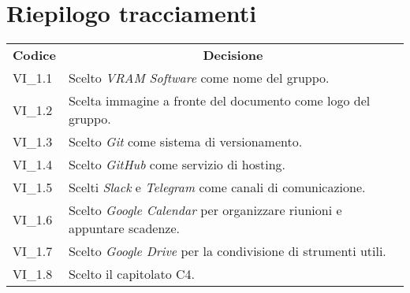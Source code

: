 % 
\setcounter{secnumdepth}{0}
\section{Riepilogo tracciamenti}
\begin{longtable} {
		>{\centering}p{17mm} 
		>{}p{120mm}}
	\rowcolor{gray!50}
	\textbf{Codice} & \multicolumn{1}{c}{\textbf{Decisione}} \\%
	VI\_1.1 & Scelto \textit{VRAM Software} come nome del gruppo. \TBstrut \\ [2mm]
	VI\_1.2 & Scelta immagine a fronte del documento come logo del gruppo. \TBstrut \\ [2mm]
	VI\_1.3 & Scelto \textit{Git} come sistema di versionamento. \TBstrut \\ [2mm]
	VI\_1.4 & Scelto \textit{GitHub} come servizio di hosting. \TBstrut \\ [2mm]
	VI\_1.5 & Scelti \textit{Slack} e \textit{Telegram} come canali di comunicazione. \TBstrut \\ [2mm]
	VI\_1.6 & Scelto \textit{Google Calendar} per organizzare riunioni e appuntare scadenze. \TBstrut \\ [2mm]
	VI\_1.7 & Scelto \textit{Google Drive} per la condivisione di strumenti utili. \TBstrut \\ [2mm]
	VI\_1.8 & Scelto il capitolato C4. \TBstrut \\ [2mm]
\end{longtable}